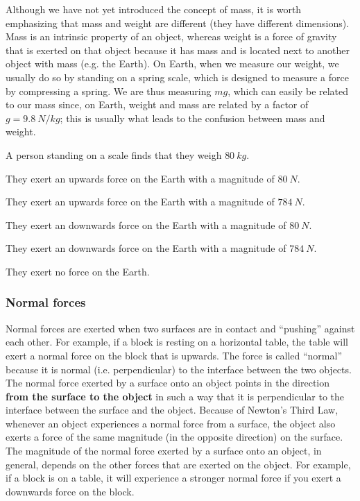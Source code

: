 Although we have not yet introduced the concept of mass, it is worth emphasizing that mass and weight are different (they have different dimensions). Mass is an intrinsic property of an object, whereas weight is a force of gravity that is exerted on that object because it has mass and is located next to another object with mass (e.g. the Earth). On Earth, when we measure our weight, we usually do so by standing on a spring scale, which is designed to measure a force by compressing a spring. We are thus measuring $mg$, which can easily be related to our mass since, on Earth, weight and mass are related by a factor of $g=\SI{9.8}{N/kg}$; this is usually what leads to the confusion between mass and weight.
\begin{checkpoint}
\begin{MCquestion}{A person standing on a scale finds that they weigh $\SI{80}{kg}$.}
\item They exert an upwards force on the Earth with a magnitude of $\SI{80}{N}$.
\item They exert an upwards force on the Earth with a magnitude of $\SI{784}{N}$.\correct
\item They exert an downwards force on the Earth with a magnitude of $\SI{80}{N}$.
\item They exert an downwards force on the Earth with a magnitude of $\SI{784}{N}$.
\item They exert no force on the Earth.
\end{MCquestion}
\end{checkpoint}


\subsubsection{Normal forces}
Normal forces are exerted when two surfaces are in contact and ``pushing'' against each other. For example, if a block is resting on a horizontal table, the table will exert a normal force on the block that is upwards. The force is called ``normal'' because it is normal (i.e. perpendicular) to the interface between the two objects. The normal force exerted by a surface onto an object points in the direction \textbf{from the surface to the object} in such a way that it is perpendicular to the interface between the surface and the object. Because of Newton's Third Law, whenever an object experiences a normal force from a surface, the object also exerts a force of the same magnitude (in the opposite direction) on the surface. The magnitude of the normal force exerted by a surface onto an object, in general, depends on the other forces that are exerted on the object. For example, if a block is on a table, it will experience a stronger normal force if you exert a downwards force on the block.

